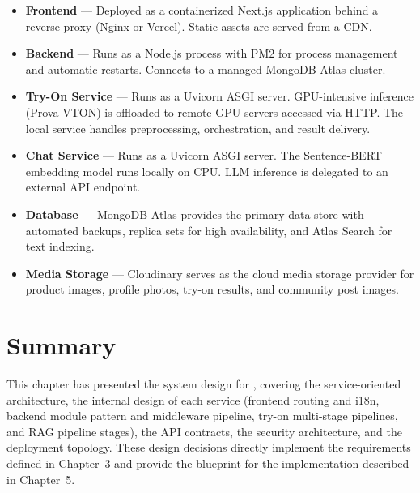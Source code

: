 \begin{itemize}[leftmargin=*]
    \item \textbf{Frontend} — Deployed as a containerized Next.js application behind a reverse proxy (Nginx or Vercel). Static assets are served from a CDN.

    \item \textbf{Backend} — Runs as a Node.js process with PM2 for process management and automatic restarts. Connects to a managed MongoDB Atlas cluster.

    \item \textbf{Try-On Service} — Runs as a Uvicorn ASGI server. GPU-intensive inference (Prova-VTON) is offloaded to remote GPU servers accessed via HTTP. The local service handles preprocessing, orchestration, and result delivery.

    \item \textbf{Chat Service} — Runs as a Uvicorn ASGI server. The Sentence-BERT embedding model runs locally on CPU. LLM inference is delegated to an external API endpoint.

    \item \textbf{Database} — MongoDB Atlas provides the primary data store with automated backups, replica sets for high availability, and Atlas Search for text indexing.

    \item \textbf{Media Storage} — Cloudinary serves as the cloud media storage provider for product images, profile photos, try-on results, and community post images.
\end{itemize}

\section{Summary}
This chapter has presented the system design for \projectname, covering the service-oriented architecture, the internal design of each service (frontend routing and i18n, backend module pattern and middleware pipeline, try-on multi-stage pipelines, and RAG pipeline stages), the API contracts, the security architecture, and the deployment topology. These design decisions directly implement the requirements defined in Chapter~3 and provide the blueprint for the implementation described in Chapter~5.
